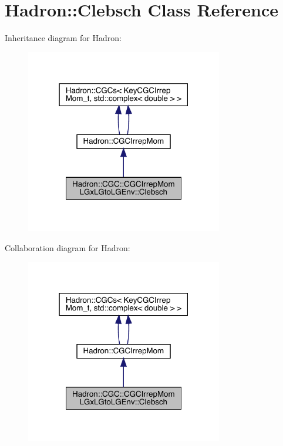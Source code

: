 \hypertarget{classHadron_1_1CGC_1_1CGCIrrepMomLGxLGtoLGEnv_1_1Clebsch}{}\section{Hadron\+:\+:Clebsch Class Reference}
\label{classHadron_1_1CGC_1_1CGCIrrepMomLGxLGtoLGEnv_1_1Clebsch}


Inheritance diagram for Hadron\+:\nopagebreak
\begin{figure}[H]
\begin{center}
\leavevmode
\includegraphics[width=244pt]{d5/d91/classHadron_1_1CGC_1_1CGCIrrepMomLGxLGtoLGEnv_1_1Clebsch__inherit__graph}
\end{center}
\end{figure}


Collaboration diagram for Hadron\+:\nopagebreak
\begin{figure}[H]
\begin{center}
\leavevmode
\includegraphics[width=244pt]{d2/dbd/classHadron_1_1CGC_1_1CGCIrrepMomLGxLGtoLGEnv_1_1Clebsch__coll__graph}
\end{center}
\end{figure}
